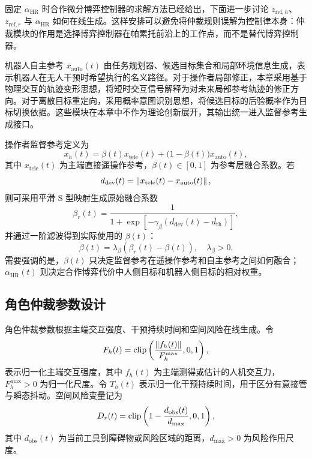 固定 $\alpha_{\mathrm{HR}}$ 时合作微分博弈控制器的求解方法已经给出，下面进一步讨论 $z_{\mathrm{ref},h}$、$z_{\mathrm{ref},r}$ 与 $\alpha_{\mathrm{HR}}$ 如何在线生成。这样安排可以避免将仲裁规则误解为控制律本身：仲裁模块的作用是选择博弈控制器在帕累托前沿上的工作点，而不是替代博弈控制器。

机器人自主参考 $x_{\mathrm{auto}}(t)$ 由任务规划器、候选目标集合和局部环境信息生成，表示机器人在无人干预时希望执行的名义路径。对于操作者局部修正，本章采用基于物理交互的轨迹变形思想，将短时交互信号解释为对未来局部参考轨迹的修正方向\cite{losey2018trajectory}。对于离散目标重定向，采用概率意图识别思想，将候选目标的后验概率作为目标切换依据\cite{jain2020probabilistic}。这些模块在本章中不作为理论创新展开，其输出统一进入监督参考生成接口。

操作者监督参考定义为
\begin{equation}
  x_h(t)=\beta(t)x_{\mathrm{tele}}(t)+\bigl(1-\beta(t)\bigr)x_{\mathrm{auto}}(t),
  \label{eq:ch3_ref_blending_arbitration}
\end{equation}
其中 $x_{\mathrm{tele}}(t)$ 为主端直接遥操作参考，$\beta(t)\in[0,1]$ 为参考层融合系数。若
\begin{equation}
  d_{\mathrm{dev}}(t)=\left\lVert x_{\mathrm{tele}}(t)-x_{\mathrm{auto}}(t)\right\rVert,
  \label{eq:ch3_dev}
\end{equation}
则可采用平滑 S 型映射生成原始融合系数
\begin{equation}
  \beta_r(t)=\frac{1}{1+\exp[-\gamma_\beta(d_{\mathrm{dev}}(t)-d_{\mathrm{th}})]},
  \label{eq:ch3_beta_raw}
\end{equation}
并通过一阶滤波得到实际使用的 $\beta(t)$：
\begin{equation}
  \dot\beta(t)=\lambda_\beta(\beta_r(t)-\beta(t)),\quad \lambda_\beta>0.
  \label{eq:ch3_beta_filter}
\end{equation}
需要强调的是，$\beta(t)$ 只决定监督参考在遥操作参考和自主参考之间如何融合；$\alpha_{\mathrm{HR}}(t)$ 则决定合作博弈代价中人侧目标和机器人侧目标的相对权重。

\subsection{角色仲裁参数设计}
\label{subsec:ch3_alpha_design}

角色仲裁参数根据主端交互强度、干预持续时间和空间风险在线生成。令
\begin{equation}
  F_h(t)=\operatorname{clip}\left(\frac{\left\lVert f_h(t)\right\rVert}{F_h^{\max}},0,1\right),
  \label{eq:ch3_Fh}
\end{equation}
表示归一化主端交互强度，其中 $f_h(t)$ 为主端测得或估计的人机交互力，$F_h^{\max}>0$ 为归一化尺度。令 $T_h(t)$ 表示归一化干预持续时间，用于区分有意接管与瞬态抖动。空间风险变量记为
\begin{equation}
  D_r(t)=\operatorname{clip}\left(1-\frac{d_{\mathrm{obs}}(t)}{d_{\max}},0,1\right),
  \label{eq:ch3_Dr}
\end{equation}
其中 $d_{\mathrm{obs}}(t)$ 为当前工具到障碍物或风险区域的距离，$d_{\max}>0$ 为风险作用尺度。

